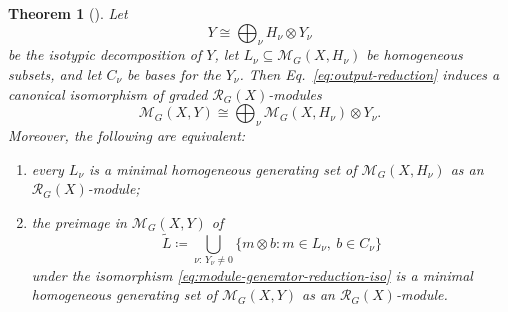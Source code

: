 \documentclass[11pt]{article}
\newcommand{\scM}{\mathcal{M}}
\newcommand{\scR}{\mathcal{R}}
\newtheorem{theorem}{Theorem}[section]
\theoremstyle{definition}
\begin{document}
\begin{theorem}[]\label{thm:module-generator-reduction}
  Let
  \[
    Y\cong \bigoplus_{\nu} H_\nu\otimes Y_\nu
  \]
  be the isotypic decomposition of $Y$, let $L_\nu \subseteq \scM_G(X,H_\nu)$ be homogeneous subsets, and let $C_\nu$ be bases for the $Y_\nu$.
  Then Eq.~\eqref{eq:output-reduction} induces a canonical isomorphism of graded $\scR_G(X)$-modules
  \begin{equation}\label{eq:module-generator-reduction-iso}
    \scM_G(X,Y)\cong\bigoplus_{\nu}\scM_G(X,H_\nu)\otimes Y_\nu.
  \end{equation}
  Moreover, the following are equivalent:
  \begin{enumerate}[label=\textup{(\roman*)}]
    \item every $L_\nu$ is a minimal homogeneous generating set of $\scM_G(X,H_\nu)$ as an $\scR_G(X)$-module;
    \item the preimage in $\scM_G(X,Y)$ of
    \[
      \widetilde L\coloneq \bigcup_{\nu:\,Y_\nu\neq 0}\{m\otimes b : m\in L_\nu,\ b\in C_\nu\}
    \]
    under the isomorphism \eqref{eq:module-generator-reduction-iso} is a minimal homogeneous generating set of $\scM_G(X,Y)$ as an $\scR_G(X)$-module.
  \end{enumerate}
\end{theorem}
\end{document}
